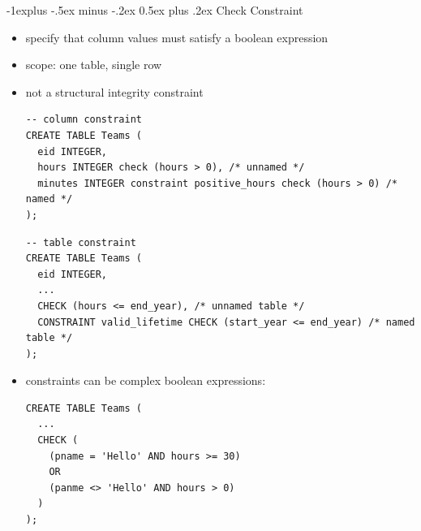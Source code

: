 \documentclass[10pt, landscape]{article}
\makeatletter
\renewcommand{\subsection}{\@startsection{subsection}{2}{0mm}%
  {-1explus -.5ex minus -.2ex}%
  {0.5ex plus .2ex}%
{\normalfont\normalsize\bfseries}}
\makeatother
\begin{document}
\begin{multicols}{3}
  \subsection{Check Constraint}
  \begin{itemize}
    \item specify that column values must satisfy a boolean expression
    \item scope: one table, single row
    \item not a structural integrity constraint
      \begin{lstlisting}[style=mySQL]
-- column constraint
CREATE TABLE Teams (
  eid INTEGER,
  hours INTEGER check (hours > 0), /* unnamed */
  minutes INTEGER constraint positive_hours check (hours > 0) /* named */
);  
      \end{lstlisting}
      \begin{lstlisting}[style=mySQL]
-- table constraint
CREATE TABLE Teams (
  eid INTEGER,
  ...
  CHECK (hours <= end_year), /* unnamed table */
  CONSTRAINT valid_lifetime CHECK (start_year <= end_year) /* named table */
);  
      \end{lstlisting}
    \item {} constraints can be complex boolean expressions:
      \begin{lstlisting}[style=mySQL]
CREATE TABLE Teams (
  ...
  CHECK (
    (pname = 'Hello' AND hours >= 30)
    OR
    (panme <> 'Hello' AND hours > 0)
  )
);  
      \end{lstlisting}
  \end{itemize}


\end{multicols}
\end{document}
